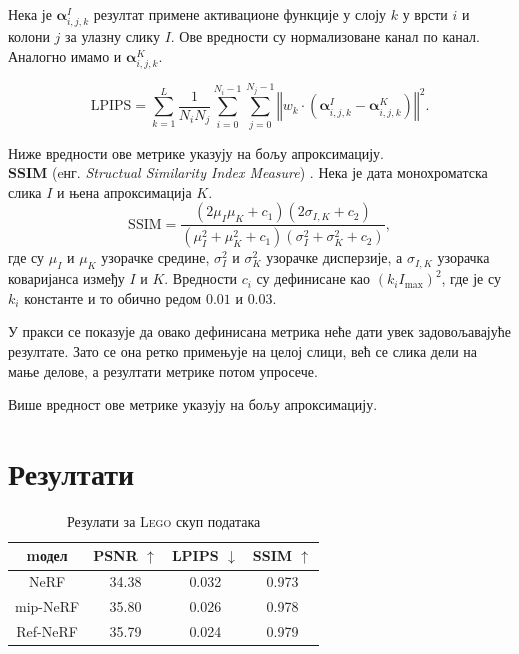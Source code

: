 \documentclass[12pt, a4paper, twoside]{book}
\numberwithin{equation}{chapter}
\numberwithin{theorem}{section}
\numberwithin{definition}{section}
\numberwithin{definitionChapter}{chapter}
\begin{document}
Нека је $\boldsymbol{\alpha}_{i, j, k}^{I}$ резултат примене активационе функције у слоју $k$ у врсти
$i$ и колони $j$ за улазну слику $I$. Ове вредности су нормализоване канал по канал. Аналогно имамо и
$\boldsymbol{\alpha}_{i, j, k}^{K}$.

\begin{equation}
	\text{LPIPS} = \sum_{k=1}^{L}\frac{1}{N_i N_j}\sum_{i=0}^{N_i - 1}\sum_{j=0}^{N_j - 1}
	\left\Vert w_k \cdot (\boldsymbol{\alpha}_{i, j, k}^{I} - \boldsymbol{\alpha}_{i, j, k}^{K}) \right\Vert^2.
\end{equation}

Ниже вредности ове метрике указују на бољу апроксимацију. \\

\noindent \textbf{SSIM} (eнг. \textit{Structual Similarity Index Measure}) \cite{ssim}.  Нека је дата монохроматска
слика $I$ и њена апроксимација $K$.
\begin{equation}
	\text{SSIM} = \frac{(2\mu_{I}\mu_{K} + c_1)(2\sigma_{I, K} + c_2)}{(\mu_{I}^2 + \mu_{K}^2 + c_1)(\sigma_{I}^2 + \sigma_{K}^2 + c_2)},
\end{equation}
где су $\mu_{I}$ и $\mu_{K}$ узорачке средине, $\sigma_{I}^2$ и $\sigma_{K}^2$ узорачке дисперзије, а $\sigma_{I, K}$
узорачка коваријанса између $I$ и $K$. Вредности $c_i$ су дефинисане као $(k_i I_{\max})^2$, где је су $k_i$ константе
и то обично редом $0.01$ и $0.03$.

У пракси се показује да овако дефинисана метрика неће дати увек задовољавајуће резултате. Зато се она ретко примењује
на целој слици, већ се слика дели на мање делове, а резултати метрике потом упросече.

Више вредност ове метрике указују на бољу апроксимацију.

\section{Резултати}

	\begin{table}[H]
		\centering
		\begin{tabular}{cccc} \toprule
			{mодел}			& {PSNR $\uparrow$}	& {LPIPS $\downarrow$}	& {SSIM $\uparrow$} \\ \midrule
			{NeRF}			& 34.38				& 0.032					& 0.973 \\ 
			{mip-NeRF}		& 35.80				& 0.026					& 0.978 \\
			{Ref-NeRF}		& 35.79				& 0.024					& 0.979 \\ \bottomrule
		\end{tabular}
		\caption{Резулати за \textsc{Lego} скуп података}
		\label{table-lego}
	\end{table}
\end{document}
